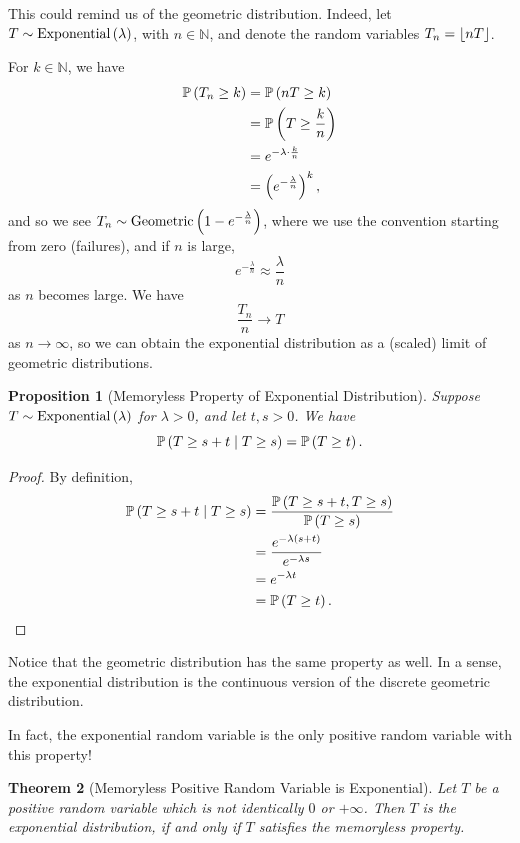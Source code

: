 \documentclass{article}
\newtheorem{theorem}{Theorem}[section]
\newtheorem{proposition}[theorem]{Proposition}
\theoremstyle{definition}
\theoremstyle{remark}
\newcommand{\NN}{\mathbb{N}}
\newcommand{\Prob}{\mathbb{P}}
\newcommand{\Conditional}[2]{#1\mid #2}
\newcommand{\plusinfty}{+\infty}
\newcommand{\flatfrac}[2]{\frac{#1}{#2}}
\DeclarePairedDelimiter{\floor}{\lfloor}{\rfloor}
\newcommand{\Exponential}{\operatorname{Exponential}}
\newcommand{\Geometric}{\operatorname{Geometric}}
\begin{document}
This could remind us of the geometric distribution. Indeed, let \(T \sim \Exponential \pqty{\lambda}\), with \(n \in \NN\), and denote the random variables \(T_n = \floor{nT}\).

For \(k \in \NN\), we have
\begin{align*}
    \Prob\pqty{T_n \geq k} &= \Prob\pqty{nT \geq k} \\
    &= \Prob\pqty{T \geq \frac{k}{n}} \\
    &= e^{- \lambda \cdot \frac{k}{n}} \\
    &= \pqty{e^{-{\frac{\lambda}{n}}}}^{k},
\end{align*}
and so we see \(T_n \sim \Geometric\pqty{1 - e^{- \flatfrac{\lambda}{n}}}\), where we use the convention starting from zero (failures), and if \(n\) is large,
\[
    e^{- \frac{\lambda}{n}} \approx \frac{\lambda}{n}
\]
as \(n\) becomes large. We have
\[
    \frac{T_n}{n} \to T
\]
as \(n \to \infty\), so we can obtain the exponential distribution as a (scaled) limit of geometric distributions.

\begin{proposition}[Memoryless Property of Exponential Distribution]
    \label{prop:memoryless-property-exponential}%
    Suppose \(T \sim \Exponential\pqty{\lambda}\) for \(\lambda > 0\), and let \(t, s > 0\). We have
    \[
        \Prob\pqty{\Conditional{T \geq s + t}{T \geq s}} = \Prob\pqty{T \geq t}.
    \]
\end{proposition}

\begin{proof}
    By definition,
    \begin{align*}
        \Prob\pqty{\Conditional{T \geq s + t}{T \geq s}} &= \frac{\Prob\pqty{T \geq s + t, T \geq s}}{\Prob\pqty{T \geq s}} \\
        &= \frac{e^{-\lambda \pqty{s + t}}}{e^{-\lambda s}} \\
        &= e^{-\lambda t} \\
        &= \Prob\pqty{T \geq t}.
    \end{align*}
\end{proof}

Notice that the geometric distribution has the same property as well. In a sense, the exponential distribution is the continuous version of the discrete geometric distribution.

In fact, the exponential random variable is the only positive random variable with this property!

\begin{theorem}[Memoryless Positive Random Variable is Exponential]
    \label{thm:memoryless-rv-is-exponential}%
    Let \(T\) be a positive random variable which is not identically \(0\) or \(\plusinfty\). Then \(T\) is the exponential distribution, if and only if \(T\) satisfies the memoryless property.
\end{theorem}
\end{document}
